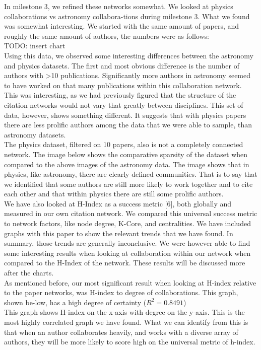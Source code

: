 \documentclass[times, 10pt,twocolumn]{article}
\begin{document}
In milestone 3, we refined these networks somewhat. We looked at physics collaborations vs astronomy collabora-tions during milestone 3. What we found was somewhat interesting. We started with the same amount of papers, and roughly the same amount of authors, the numbers were as follows: \\
TODO: insert chart\\
Using this data, we observed some interesting differences between the astronomy and physics datasets. The first and most obvious difference is the number of authors with >10 publications. Significantly more authors in astronomy seemed to have worked on that many publications within this collaboration network. \\
This was interesting, as we had previously figured that the structure of the citation networks would not vary that greatly between disciplines. This set of data, however, shows something different. It suggests that with physics papers there are less prolific authors among the data that we were able to sample, than astronomy datasets. \\
The physics dataset, filtered on 10 papers, also is not a completely connected network. The image below shows the comparative sparsity of the dataset when compared to the above images of the astronomy data. The image shows that in physics, like astronomy, there are clearly defined communities. That is to say that we identified that some authors are still more likely to work together and to cite each other and that within physics there are still some prolific authors. \\
We have also looked at H-Index as a success metric [6], both globally and measured in our own citation network. We compared this universal success metric to network factors, like node degree, K-Core, and centralities. We have included graphs with this paper to show the relevant trends that we have found. In summary, those trends are generally inconclusive. We were however able to find some interesting results when looking at collaboration within our network when compared to the H-Index of the network. These results will be discussed more after the charts. \\
As mentioned before, our most significant result when looking at H-index relative to the paper networks, was H-index to degree of collaborations. This graph, shown be-low, has a high degree of certainty ($R^2 = 0.8491$)  \\
This graph shows H-index on the x-axis with degree on the y-axis. This is the most highly correlated graph we have found. What we can identify from this is that when an author collaborates heavily, and works with a diverse array of authors, they will be more likely to score high on the universal metric of h-index. \\
\end{document}
